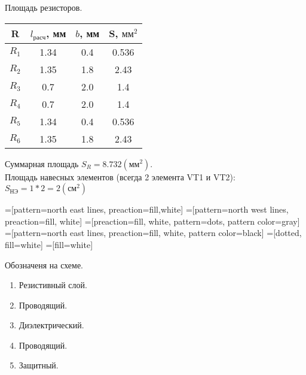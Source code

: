 \documentclass[12pt, a4paper] {ncc}
\begin{document}
    Площадь резисторов.\\

	\begin{tabular}{|c|c|c|c|}
		\hline
            R   & $l_{\text{расч}}$, мм & $b$, мм & S, $\text{мм}^2$ \\ \hline
          $R_1$ & 1.34              	&  0.4    & 0.536 \\ \hline
          $R_2$ & 1.35              	&  1.8    & 2.43  \\ \hline
          $R_3$ & 0.7               	&  2.0    & 1.4  \\ \hline
          $R_4$ & 0.7               	&  2.0    & 1.4  \\ \hline
          $R_5$ & 1.34              	&  0.4    & 0.536  \\ \hline
          $R_6$ & 1.35              	&  1.8    & 2.43 \\ \hline
	\end{tabular}

	Суммарная площадь $S_R = 8.732 (\text{мм}^2)$.\\

	Площадь навесных элементов (всегда 2 элемента VT1 и VT2): $S_{\text{НЭ}} = 1 * 2 = 2 (\text{см}^2)$

=[pattern=north east lines, preaction={fill,white}]
=[pattern=north west lines, preaction={fill, white}]
=[preaction={fill, white}, pattern=dots, pattern color=gray]
=[pattern=north east lines, preaction={fill, white},
                   pattern color=black]
=[dotted, fill=white]
=[fill=white]

	Обозначеня на схеме.
	\begin{enumerate}
		\item Резистивный слой.


		\item Проводящий.

		\item Диэлектрический. 

		\item Проводящий.

		\item Защитный. 

	\end{enumerate}
\end{document}
